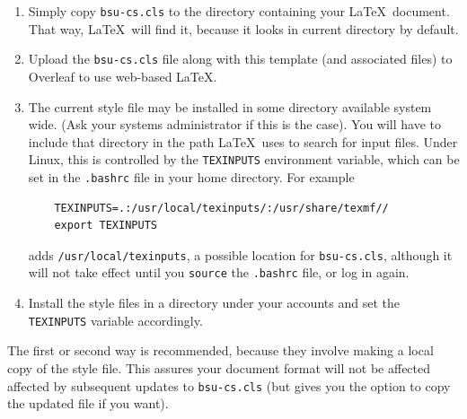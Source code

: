 \documentclass[dissertation, proposal]{bsu-cs}  %
\begin{document}
\begin{enumerate}
\item Simply copy \texttt{bsu-cs.cls} to the directory containing your \LaTeX\ document.
That way, \LaTeX\ will find it, because it looks in current directory by default.

\item Upload the \texttt{bsu-cs.cls} file along with this template (and associated files)
to Overleaf to use web-based LaTeX.

\item The current style file may be installed in some directory available system wide.  (Ask your
systems administrator if this is the case).  You will have to include that directory in the path
\LaTeX\ uses to search for input files.  Under Linux, this is controlled by the \texttt{TEXINPUTS}
environment variable, which can be set in the \texttt{.bashrc} file in your home directory.
For example
%
\begin{verbatim}
    TEXINPUTS=.:/usr/local/texinputs/:/usr/share/texmf//
    export TEXINPUTS
\end{verbatim}
adds \texttt{/usr/local/texinputs}, a possible location for \texttt{bsu-cs.cls}, although it
will not take effect until you \texttt{source} the \texttt{.bashrc} file, or log in again.

\item Install the style files in a directory under your accounts and set the \texttt{TEXINPUTS}
variable accordingly.

\end{enumerate}

%

The first or second way is recommended, because they involve making a local copy of the style
file.  This assures your document format will not be affected affected by subsequent updates
to \texttt{bsu-cs.cls} (but gives you the option to copy the updated file if you want).
\end{document}
